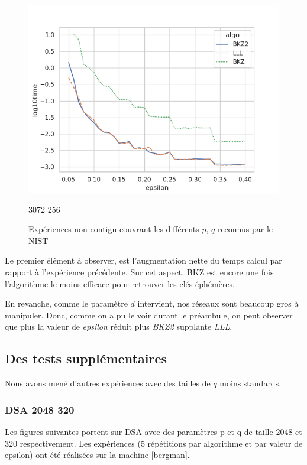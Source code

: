\documentclass{backend}
\begin{document}
\begin{figure}[H]
\begin{minipage}{0.45\textwidth}
        \centering
        \includegraphics[width=\textwidth]{img/non_contigu/3072_256_mint_maxm_epsi_time_log.png}
        \caption{3072 256}
        \label{fig:image3_non_contigu}
    \end{minipage}
    \caption{Expériences non-contigu couvrant les différents $p$, $q$ reconnus par le NIST}
    \label{fig:non_contigu}
\end{figure}

Le premier élément à observer, est l'augmentation nette du temps calcul par rapport à l'expérience précédente. Sur cet aspect, BKZ est encore une fois l'algorithme le moins efficace pour retrouver les clés éphémères.\smallbreak

En revanche, comme le paramètre $d$ intervient, nos réseaux sont beaucoup gros à manipuler. Donc, comme on a pu le voir durant le préambule, on peut observer que plus la valeur de \textit{epsilon} réduit plus \textit{BKZ2} supplante \textit{LLL}.

\newpage
\subsection{Des tests supplémentaires}

Nous avons mené d'autres expériences avec des tailles de $q$ moins standards.
 
\subsubsection{DSA 2048 320}


Les figures suivantes portent sur DSA avec des paramètres p et q de taille 2048 et 320 respectivement. %
Les expériences (5 répétitions par algorithme et par valeur de epsilon) ont été réalisées sur la machine \ref{bergman}.
\end{document}
